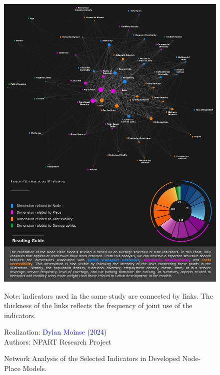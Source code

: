 \begin{refsegment}
    \begin{figure}[h!]\vspace*{4pt}
        \caption{Network Analysis of the Selected Indicators in Developed Node-Place Models.}
        \label{fig-chap6:litterature-indicateurs}
        \centerline{\includegraphics[width=1\columnwidth]{src/Figures/Chap-6/EN_NPART_Litterature_indicateurs.pdf}}
        \vspace{5pt}
        \begin{flushleft}\scriptsize{
        Note: indicators used in the same study are connected by links. The thickness of the links reflects the frequency of joint use of the indicators.
        }\end{flushleft}
        \begin{flushright}\scriptsize{
        Realization: \textcolor{blue}{Dylan Moinse (2024)}
        \\
        Authors: \acrshort{NPART} Research Project
        }\end{flushright}
    \end{figure}


\end{refsegment}
